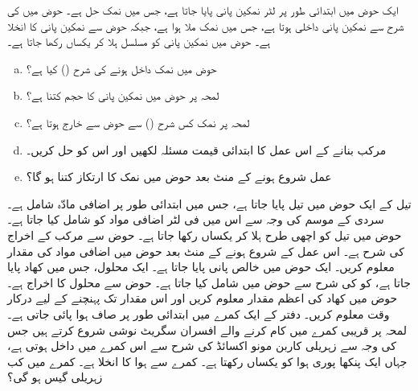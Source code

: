 ایک حوض میں ابتدائی طور پر  لٹر نمکین   پانی   پایا جاتا ہے،  جس میں  نمک حل ہے۔ حوض میں  کی  شرح سے نمکین پانی داخلی ہوتا ہے،  جس میں  نمک ملا ہوا ہے،  جبکہ حوض سے نمکین  پانی کا انخلا  ہے۔ حوض میں نمکین پانی کو مسلسل ہلا کر یکساں رکھا جاتا ہے۔
\begin{enumerate}[a.]
\item
حوض میں نمک داخل ہونے کی شرح () کیا ہے؟
\item
لمحہ  پر حوض میں نمکین پانی کا حجم کتنا ہے؟
\item
لمحہ  پر نمک کس شرح () سے حوض سے خارج ہوتا ہے؟
\item
 مرکب بنانے کے اس عمل کا ابتدائی قیمت مسئلہ لکھیں اور اس کو حل کریں۔
\item
عمل شروع ہونے کے  منٹ بعد حوض میں نمک کا ارتکاز کتنا ہو گا؟ 
\end{enumerate}
تیل  کے ایک حوض میں  تیل    پایا جاتا ہے،  جس میں ابتدائی طور پر  اضافی مادّہ شامل ہے۔ سردی کے موسم کی وجہ سے اس میں  فی لٹر اضافی مواد کو   شامل کیا جاتا ہے۔ حوض میں تیل کو اچھی طرح ہلا کر یکساں رکھا جاتا ہے۔ حوض سے مرکب کے اخراج   کی شرح  ہے۔ اس عمل کے شروع ہونے کے  منٹ بعد حوض میں اضافی مواد کی مقدار معلوم کریں۔
ایک حوض میں  خالص پانی  پایا جاتا  ہے۔ ایک محلول،  جس میں   کھاد پایا جاتا ہے، کو  کی  شرح سے حوض میں شامل کیا جاتا ہے۔ حوض سے محلول کا اخراج   ہے۔ حوض میں کھاد کی اعظم مقدار معلوم کریں اور اس مقدار تک پہنچنے کے لیے درکار وقت معلوم کریں۔
 دفتر کے ایک کمرے میں ابتدائی طور پر  صاف ہوا   پائی جاتی ہے۔ لمحہ  پر قریبی کمرے  میں   کام کرنے والے  افسران سگریٹ نوشی شروع کرتے ہیں جس کی وجہ سے   زہریلی کاربن مونو اکسائڈ   کی شرح سے اس کمرے  میں داخل ہوتی ہے،  جہاں ایک پنکھا پوری ہوا کو یکساں رکھتا ہے۔ کمرے سے ہوا کا انخلا  ہے۔  کمرے میں کب زہریلی گیس  ہو گی؟

